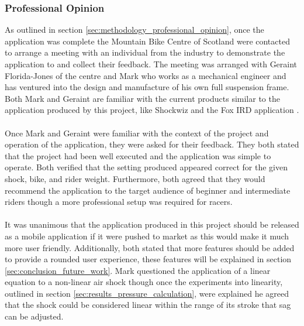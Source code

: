		\subsubsection{Professional Opinion}
			As outlined in section \ref{sec:methodology_professional_opinion}, once the application was complete the Mountain Bike Centre of Scotland were contacted to arrange a meeting with an individual from the industry to demonstrate the application to and collect their feedback. The meeting was arranged with Geraint Florida-Jones of the centre and Mark  who works as a mechanical engineer and has ventured into the design and manufacture of his own full suspension frame. Both Mark and Geraint are familiar with the current products similar to the application produced by this project, like Shockwiz \citep{shockwizweb} and the Fox IRD application \citep{foxird}.
			\\\\
			Once Mark and Geraint were familiar with the context of the project and operation of the application, they were asked for their feedback. They both stated that the project had been well executed and the application was simple to operate. Both verified that the setting produced appeared correct for the given shock, bike, and rider weight. Furthermore, both agreed that they would recommend the application to the target audience of beginner and intermediate riders though a more professional setup was required for racers.
			\\\\
			It was unanimous that the application produced in this project should be released as a mobile application if it were pushed to market as this would make it much more user friendly. Additionally, both stated that more features should be added to provide a rounded user experience, these features will be explained in section \ref{sec:conclusion_future_work}. Mark questioned the application of a linear equation to a non-linear air shock though once the experiments into linearity, outlined in section \ref{sec:results_pressure_calculation}, were explained he agreed that the shock could be considered linear within the range of its stroke that sag can be adjusted.
